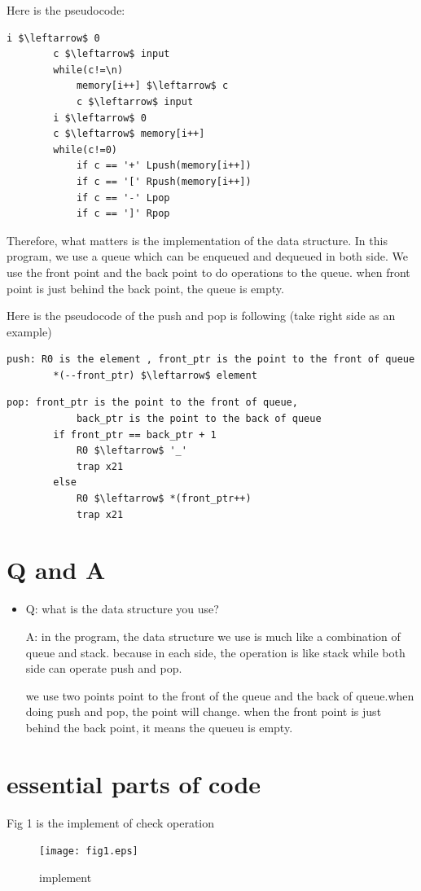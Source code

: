 \documentclass[twoside]{article}
\begin{document}
\begin{CJK*}{UTF8}{gbsn}
	Here is the pseudocode:
	\begin{lstlisting}[mathescape=true]
		i $\leftarrow$ 0
		c $\leftarrow$ input
		while(c!=\n)
			memory[i++] $\leftarrow$ c
			c $\leftarrow$ input
		i $\leftarrow$ 0
		c $\leftarrow$ memory[i++]
		while(c!=0)
			if c == '+' Lpush(memory[i++])
			if c == '[' Rpush(memory[i++])
			if c == '-' Lpop
			if c == ']' Rpop
	\end{lstlisting}
	
	
	Therefore, what matters is the implementation of the data structure. In this program, we use a queue which can be enqueued and dequeued in both side. We use the front point and the back point to do operations to the queue. when front point is just behind the back point, the queue is empty.
	
	Here is the pseudocode of the push and pop is following (take right side as an example)
	
	\begin{lstlisting}[mathescape=true]
		push: R0 is the element , front_ptr is the point to the front of queue
		*(--front_ptr) $\leftarrow$ element
	\end{lstlisting}


	\begin{lstlisting}[mathescape=true]
		pop: front_ptr is the point to the front of queue,
			back_ptr is the point to the back of queue
		if front_ptr == back_ptr + 1
			R0 $\leftarrow$ '_'
			trap x21
		else 
			R0 $\leftarrow$ *(front_ptr++)
			trap x21
	\end{lstlisting}


	\section{Q and A}
	\begin{itemize}
		\item 	Q: what is the data structure you use?
		
				A: in the program, the data structure we use is much like a combination of queue and stack. because in each side, the operation is like stack while both side can operate push and pop.
				
				we use two points point to the front of the queue and the back of queue.when doing push and pop, the point will change. when the front point is just behind the back point, it means the queueu is empty.
	\end{itemize}


	\section{essential parts of code}
	Fig 1 is the implement of check operation
	\begin{figure}[htbp]
		\small
		\centering
		\texttt{[image: fig1.eps]}
		\caption{implement} %
	\end{figure}
	

\end{CJK*}
\end{document}
